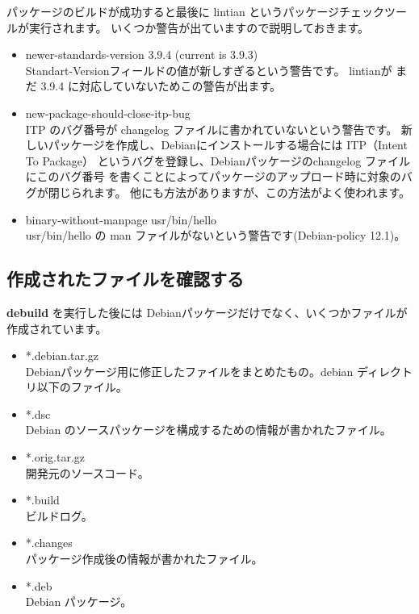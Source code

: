 \documentclass[mingoth,a4paper]{jsarticle}
\begin{document}
パッケージのビルドが成功すると最後に lintian というパッケージチェックツールが実行されます。
いくつか警告が出ていますので説明しておきます。
\begin{itemize}
\item newer-standards-version 3.9.4 (current is 3.9.3)\\
Standart-Versionフィールドの値が新しすぎるという警告です。
lintianが まだ 3.9.4 に対応していないためこの警告が出ます。
\item new-package-should-close-itp-bug \\
ITP のバグ番号が changelog ファイルに書かれていないという警告です。
新しいパッケージを作成し、Debianにインストールする場合には ITP（Intent To Package）
というバグを登録し、Debianパッケージのchangelog ファイルにこのバグ番号
を書くことによってパッケージのアップロード時に対象のバグが閉じられます。
他にも方法がありますが、この方法がよく使われます。

\item binary-without-manpage usr/bin/hello \\
usr/bin/hello の man ファイルがないという警告です(Debian-policy 12.1)。
\end{itemize}

\subsection{作成されたファイルを確認する}

{\bf debuild} を実行した後には Debianパッケージだけでなく、いくつかファイルが作成されています。


\begin{itemize}
\item *.debian.tar.gz\\
Debianパッケージ用に修正したファイルをまとめたもの。debian ディレクトリ以下のファイル。
\item *.dsc\\
Debian のソースパッケージを構成するための情報が書かれたファイル。
\item *.orig.tar.gz\\
開発元のソースコード。
\item *.build\\
ビルドログ。
\item *.changes\\
パッケージ作成後の情報が書かれたファイル。
\item *.deb\\
Debian パッケージ。
\end{itemize}
\end{document}
